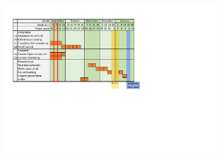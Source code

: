 \documentclass[11pt]{report}
\numberwithin{equation}{section}        %
\numberwithin{figure}{section}          %
\numberwithin{table}{section}           %
\begin{document}
  \begin{figure}[H]
  \centering
  \includegraphics[width=0.7\textwidth, trim={0.87cm 9.5cm 10cm 1.5cm},clip]{Graphics/planning v2.pdf}

  \label{fig:my_label}
  \end{figure}
\end{document}
